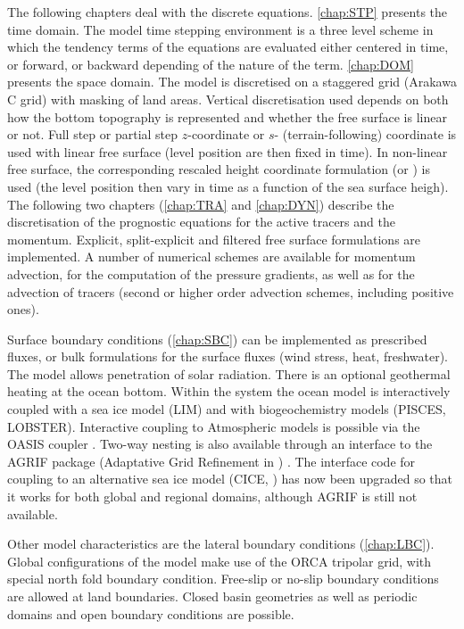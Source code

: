 \documentclass[../main/NEMO_manual]{subfiles}
\begin{document}
The following chapters deal with the discrete equations.
\autoref{chap:STP} presents the time domain.
The model time stepping environment is a three level scheme in which the tendency terms of
the equations are evaluated either centered in time, or forward, or backward depending of the nature of the term.
\autoref{chap:DOM} presents the space domain.
The model is discretised on a staggered grid (Arakawa C grid) with masking of land areas.
Vertical discretisation used depends on both how the bottom topography is represented and
whether the free surface is linear or not.
Full step or partial step $z$-coordinate or $s$- (terrain-following) coordinate is used with
linear free surface (level position are then fixed in time).
In non-linear free surface,
the corresponding rescaled height coordinate formulation (\zstar or \sstar) is used
(the level position then vary in time as a function of the sea surface heigh).
The following two chapters (\autoref{chap:TRA} and \autoref{chap:DYN}) describe the discretisation of
the prognostic equations for the active tracers and the momentum.
Explicit, split-explicit and filtered free surface formulations are implemented.
A number of numerical schemes are available for momentum advection, for the computation of the pressure gradients,
as well as for the advection of tracers (second or higher order advection schemes, including positive ones).

Surface boundary conditions (\autoref{chap:SBC}) can be implemented as prescribed fluxes,
or bulk formulations for the surface fluxes (wind stress, heat, freshwater).
The model allows penetration of solar radiation.
There is an optional geothermal heating at the ocean bottom.
Within the \NEMO system the ocean model is interactively coupled with a sea ice model (LIM) and
with biogeochemistry models (PISCES, LOBSTER).
Interactive coupling to Atmospheric models is possible via the OASIS coupler \citep{OASIS2006}.
Two-way nesting is also available through an interface to the AGRIF package
(Adaptative Grid Refinement in \fortran) \citep{Debreu_al_CG2008}.
The interface code for coupling to an alternative sea ice model (CICE, \citet{Hunke2008}) has now been upgraded so
that it works for both global and regional domains, although AGRIF is still not available.

Other model characteristics are the lateral boundary conditions (\autoref{chap:LBC}).
Global configurations of the model make use of the ORCA tripolar grid, with special north fold boundary condition.
Free-slip or no-slip boundary conditions are allowed at land boundaries.
Closed basin geometries as well as periodic domains and open boundary conditions are possible. 
\end{document}
